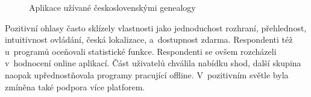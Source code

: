 	\begin{figure}[H]
		\begin{bchart}[min=0,steps={20,40,80},max=110]
				\smallskip
				\smallskip
				\smallskip
				\smallskip
				\smallskip
				\smallskip
				\smallskip
				\smallskip
				\smallskip
				\smallskip
				\smallskip
				\smallskip
				\smallskip
				\smallskip
				\smallskip
				\smallskip
				\smallskip
				\smallskip
				\smallskip
				\smallskip
				\smallskip
		\end{bchart}
		\caption{Aplikace užívané československými genealogy}
		\label{chart:app}
	\end{figure}
	Pozitivní ohlasy často sklízely vlastnosti jako jednoduchost rozhraní, přehlednost, intuitivnost ovládání, česká lokalizace, a~dostupnost zdarma. Respondenti též u~programů oceňovali statistické funkce. Respondenti se ovšem rozcházeli v~hodnocení online aplikací. Část uživatelů chválila nabídku shod, další skupina naopak upřednostňovala programy pracující offline. V~pozitivním světle byla zmíněna také podpora více platforem.\par
